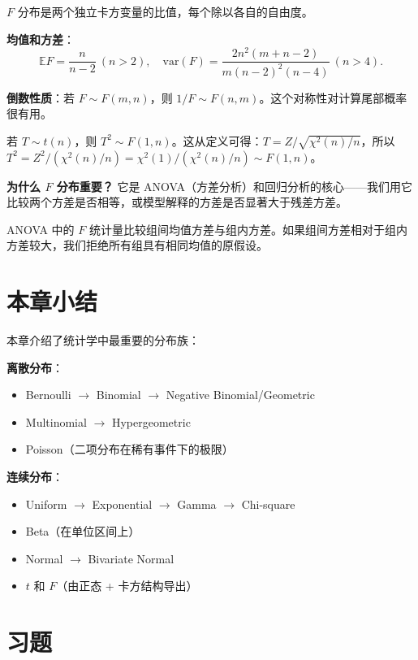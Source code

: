 $F$ 分布是两个独立卡方变量的比值，每个除以各自的自由度。

\textbf{均值和方差}：
\[
\mathbb{E}F = \frac{n}{n-2} \ (n>2), \quad \text{var}(F) = \frac{2n^{2}(m+n-2)}{m(n-2)^{2}(n-4)} \ (n>4).
\label{eq:f-moments-ch3}
\]

\textbf{倒数性质}：若 $F \sim F(m, n)$，则 $1/F \sim F(n, m)$。这个对称性对计算尾部概率很有用。

\begin{example}\label{rmk:f-to-t-relationship-ch3}
若 $T \sim t(n)$，则 $T^{2} \sim F(1, n)$。这从定义可得：$T = Z/\sqrt{\chi^{2}(n)/n}$，所以 $T^{2} = Z^{2}/(\chi^{2}(n)/n) = \chi^{2}(1)/(\chi^{2}(n)/n) \sim F(1, n)$。
\end{example}

\textbf{为什么 $F$ 分布重要？} 它是 ANOVA（方差分析）和回归分析的核心——我们用它比较两个方差是否相等，或模型解释的方差是否显著大于残差方差。

ANOVA 中的 $F$ 统计量比较组间均值方差与组内方差。如果组间方差相对于组内方差较大，我们拒绝所有组具有相同均值的原假设。

\section*{本章小结}\label{sec:chapter-summary-ch3}

本章介绍了统计学中最重要的分布族：

\textbf{离散分布}：
\begin{itemize}
\item Bernoulli $\to$ Binomial $\to$ Negative Binomial/Geometric
\item Multinomial $\to$ Hypergeometric
\item Poisson（二项分布在稀有事件下的极限）
\end{itemize}

\textbf{连续分布}：
\begin{itemize}
\item Uniform $\to$ Exponential $\to$ Gamma $\to$ Chi-square
\item Beta（在单位区间上）
\item Normal $\to$ Bivariate Normal
\item $t$ 和 $F$（由正态 + 卡方结构导出）
\end{itemize}

\section*{习题}\label{sec:exercises-ch3}

